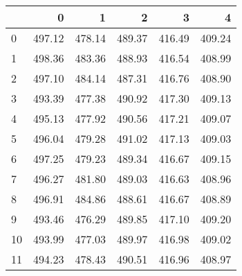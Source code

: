 \begin{tabular}{lrrrrr}
\toprule
{} &       0 &       1 &       2 &       3 &       4 \\
\midrule
0  &  497.12 &  478.14 &  489.37 &  416.49 &  409.24 \\
1  &  498.36 &  483.36 &  488.93 &  416.54 &  408.99 \\
2  &  497.10 &  484.14 &  487.31 &  416.76 &  408.90 \\
3  &  493.39 &  477.38 &  490.92 &  417.30 &  409.13 \\
4  &  495.13 &  477.92 &  490.56 &  417.21 &  409.07 \\
5  &  496.04 &  479.28 &  491.02 &  417.13 &  409.03 \\
6  &  497.25 &  479.23 &  489.34 &  416.67 &  409.15 \\
7  &  496.27 &  481.80 &  489.03 &  416.63 &  408.96 \\
8  &  496.91 &  484.86 &  488.61 &  416.67 &  408.89 \\
9  &  493.46 &  476.29 &  489.85 &  417.10 &  409.20 \\
10 &  493.99 &  477.03 &  489.97 &  416.98 &  409.02 \\
11 &  494.23 &  478.43 &  490.51 &  416.96 &  408.97 \\
\bottomrule
\end{tabular}
